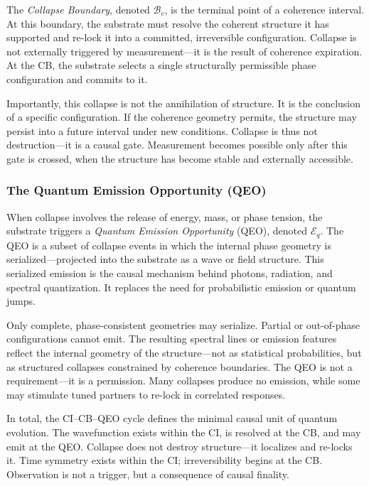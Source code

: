 \documentclass[entropy,article,submit,pdftex,moreauthors]{Definitions/mdpi}
\begin{document}
The \textit{Collapse Boundary}, denoted \( \mathcal{B}_c \), is the terminal point of a coherence interval. At this boundary, the substrate must resolve the coherent structure it has supported and re-lock it into a committed, irreversible configuration. Collapse is not externally triggered by measurement—it is the result of coherence expiration. At the CB, the substrate selects a single structurally permissible phase configuration and commits to it.

Importantly, this collapse is not the annihilation of structure. It is the conclusion of a specific configuration. If the coherence geometry permits, the structure may persist into a future interval under new conditions. Collapse is thus not destruction—it is a causal gate. Measurement becomes possible only after this gate is crossed, when the structure has become stable and externally accessible.

\subsubsection{The Quantum Emission Opportunity (QEO)}

When collapse involves the release of energy, mass, or phase tension, the substrate triggers a \textit{Quantum Emission Opportunity} (QEO), denoted \( \mathcal{E}_q \). The QEO is a subset of collapse events in which the internal phase geometry is serialized—projected into the substrate as a wave or field structure. This serialized emission is the causal mechanism behind photons, radiation, and spectral quantization. It replaces the need for probabilistic emission or quantum jumps.

Only complete, phase-consistent geometries may serialize. Partial or out-of-phase configurations cannot emit. The resulting spectral lines or emission features reflect the internal geometry of the structure—not as statistical probabilities, but as structured collapses constrained by coherence boundaries. The QEO is not a requirement—it is a permission. Many collapses produce no emission, while some may stimulate tuned partners to re-lock in correlated responses.

\smallskip

In total, the CI–CB–QEO cycle defines the minimal causal unit of quantum evolution. The wavefunction exists within the CI, is resolved at the CB, and may emit at the QEO. Collapse does not destroy structure—it localizes and re-locks it. Time symmetry exists within the CI; irreversibility begins at the CB. Observation is not a trigger, but a consequence of causal finality.
\end{document}

